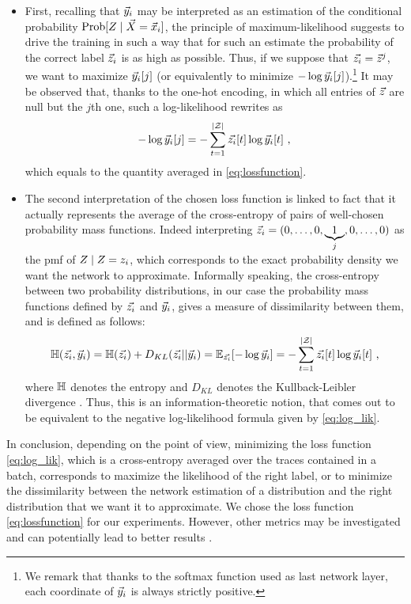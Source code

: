 \begin{itemize}
\item First, recalling that $\vec{y}_i$ may be interpreted as an estimation of the conditional probability $\prob[\given{\sensRandVar}{\vaLeakVec=\vLeakVec_i}]$, the principle of maximum-likelihood suggests to drive the training in such a way that for such an estimate the probability of the correct label $\vec{z}_i$ is as high as possible. Thus, if we suppose that $\vec{z_i} = \vec{z}^j$, we want to maximize $\vec{y}_i[j]$ (or equivalently to minimize $-\log{\ensuremath {\vec{y}}_i[j]}$).\footnote{We remark that thanks to the softmax function used as last network layer, each coordinate of $\vec{y}_i$ is always strictly positive.} It may be observed that, thanks to the one-hot encoding, in which all entries of $\vec{z}$ are null but the $j$th one, such a log-likelihood rewrites as 
\begin{equation}\label{eq:log_lik}
-\log{\ensuremath {\vec{y}}_i[j]} = -\sum_{t=1}^{|\mathcal{Z}|}\vec{z_i}[t]\log{\ensuremath {\vec{y}}_i[t]} \mbox{ ,}
\end{equation}
which equals to the quantity averaged in \eqref{eq:lossfunction}.
\item The second interpretation of the chosen loss function is linked to fact that it actually represents the average of  the cross-entropy of pairs of well-chosen probability mass functions. Indeed interpreting $\vec{z}_i = (0,\ldots , 0,\underbrace{1}_{j},0,\dots,0)$ as the pmf of $\given{\sensRandVar}{\sensRandVar = \sensVar_i}$, which corresponds to the exact probability density we want the network to approximate. Informally speaking, the cross-entropy between two probability distributions, in our case the probability mass functions defined by $\vec{z_i}$ and $\vec{y}_i$, gives a measure of dissimilarity between them, and is defined as follows:
\begin{equation}\label{eq:crossentropy}
\mathbb{H}(\vec{z_i}, \vec{y}_i) = \mathbb{H}(\vec{z_i}) + D_{KL}(\vec{z_i} || \vec{y}_i) = \mathbb{E}_{\vec{z_i}}[-\log{\ensuremath {\vec{y}}_i}] = -\sum_{t=1}^{|\mathcal{Z}|}\vec{z_i}[t]\log{\ensuremath {\vec{y}}_i[t]} \mbox{ ,}
\end{equation}
where $\mathbb{H}$ denotes the entropy and $D_{KL}$ denotes the Kullback-Leibler divergence \cite{christopher2006pattern}. Thus, this is an information-theoretic notion, that comes out to be equivalent to the negative log-likelihood formula given by \eqref{eq:log_lik}. 
\end{itemize}
In conclusion, depending on the point of view, minimizing the loss function \eqref{eq:log_lik}, which is a cross-entropy averaged over the traces contained in a batch, corresponds to maximize the likelihood of the right label, or to minimize the dissimilarity between the network estimation of a distribution and the right distribution that we want it to approximate. 
We chose the loss function \eqref{eq:lossfunction} for our experiments. However, other metrics may be investigated and can
potentially lead to better results \cite{MHK10,SSZU15}. \\


